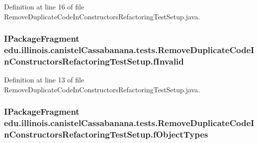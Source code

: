 Definition at line 16 of file RemoveDuplicateCodeInConstructorsRefactoringTestSetup.java.

\hypertarget{classedu_1_1illinois_1_1canistelCassabanana_1_1tests_1_1RemoveDuplicateCodeInConstructorsRefactoringTestSetup_a421cc733d2ba660b2cbc1ffb94b6ba5c}{
\subsubsection[{fInvalid}]{\setlength{\rightskip}{0pt plus 5cm}IPackageFragment {\bf edu.illinois.canistelCassabanana.tests.RemoveDuplicateCodeInConstructorsRefactoringTestSetup.fInvalid}}}
\label{classedu_1_1illinois_1_1canistelCassabanana_1_1tests_1_1RemoveDuplicateCodeInConstructorsRefactoringTestSetup_a421cc733d2ba660b2cbc1ffb94b6ba5c}


Definition at line 13 of file RemoveDuplicateCodeInConstructorsRefactoringTestSetup.java.

\hypertarget{classedu_1_1illinois_1_1canistelCassabanana_1_1tests_1_1RemoveDuplicateCodeInConstructorsRefactoringTestSetup_abe1fbe53e3d90f623a37cc5c933145dc}{
\subsubsection[{fObjectTypes}]{\setlength{\rightskip}{0pt plus 5cm}IPackageFragment {\bf edu.illinois.canistelCassabanana.tests.RemoveDuplicateCodeInConstructorsRefactoringTestSetup.fObjectTypes}}}
\label{classedu_1_1illinois_1_1canistelCassabanana_1_1tests_1_1RemoveDuplicateCodeInConstructorsRefactoringTestSetup_abe1fbe53e3d90f623a37cc5c933145dc}


